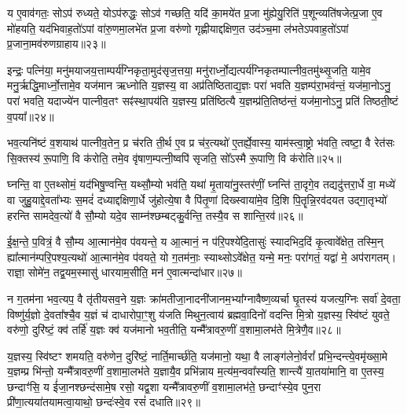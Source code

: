 य ए॒वाव॑गतः॒ सो\-ऽप॑ रुध्यते॒ यो\-ऽप॑रुद्धः॒ सो\-ऽव॑ गच्छति॒ यदि॑ का॒मये॑त प्र॒जा मु॑ह्येयु॒रिति॑ प॒शून्व्यति॑षजेत्प्र॒जा ए॒व मो॑हयति॒ यद॑भिवाह॒तो॑\-ऽपां वा॑रु॒णमा॒लभे॑त प्र॒जा वरु॑णो गृह्णीयाद्दक्षिण॒त उद॑ञ्च॒मा ल॑भते\-ऽपवाह॒तो॑\-ऽ\-पां प्र॒जाना॒मव॑रुणग्राहाय॥२३॥

{\anuvakamend[{रेतो॒ यज॑माने दधाति लो॒क ऐ॒न्द्रꣳ स॒प्तत्रिꣳ॑शच्च॥५॥}]}

इन्द्रः॒ पत्नि॑या॒ मनु॑मयाजय॒त्ताम्पर्य॑ग्निकृता॒मुद॑सृज॒त्तया॒ मनु॑रार्ध्नो॒द्यत्पर्य॑ग्निकृतम्पात्नीव॒तमु॑थ्सृ॒जति॒ यामे॒व मनु॒र्\mbox{}ऋद्धि॒\-मार्ध्नो॒त्तामे॒व यज॑मान ऋध्नोति य॒ज्ञस्य॒ वा अप्र॑तिष्ठिताद्य॒ज्ञः परा॑ भवति य॒ज्ञम्प॑रा॒भव॑न्तं॒ यज॑मा॒नो\-ऽनु॒ परा॑ भवति॒ यदाज्ये॑न पात्नीव॒तꣳ सꣴ॑स्था॒पय॑ति य॒ज्ञस्य॒ प्रति॑ष्ठित्यै य॒ज्ञम्प्र॑ति॒तिष्ठ॑न्तं॒ यज॑मा॒नो\-ऽनु॒ प्रति॑ तिष्ठती॒ष्टं व॒पया᳚॥२४॥

भव॒त्यनि॑ष्टं व॒शयाथ॑ पात्नीव॒तेन॒ प्र च॑रति ती॒र्थ ए॒व प्र च॑र॒त्यथो॑ ए॒तर्\mbox{}ह्ये॒वास्य॒ याम॑स्त्वा॒ष्ट्रो भ॑वति॒ त्वष्टा॒ वै रेत॑सः सि॒क्तस्य॑ रू॒पाणि॒ वि क॑रोति॒ तमे॒व वृ॑षाण॒म्पत्नी॒ष्वपि॑ सृजति॒ सो᳚\-ऽस्मै रू॒पाणि॒ वि क॑रोति॥२५॥

{\anuvakamend[{व॒पया॒ षट्त्रिꣳ॑शच्च॥६॥}]}

घ्नन्ति॒ वा ए॒तथ्सोमं॒ यद॑भिषु॒ण्वन्ति॒ यथ्सौ॒म्यो भव॑ति॒ यथा॑ मृ॒ताया॑नु॒स्तर॑णीं॒ घ्नन्ति॑ ता॒दृगे॒व तद्यदु॑त्तरा॒र्धे वा॒ मध्ये॑ वा जुहु॒याद्दे॒वता᳚भ्यः स॒मदं॑ दध्याद्दक्षिणा॒र्धे जु॑होत्ये॒षा वै पि॑तृ॒णां दिख्स्वाया॑मे॒व दि॒शि पि॒तॄन्नि॒रव॑दयत उद्गा॒तृभ्यो॑ हरन्ति सामदेव॒त्यो॑ वै सौ॒म्यो यदे॒व साम्न॑श्छम्बट्कु॒र्वन्ति॒ तस्यै॒व स शान्ति॒रव॑॥२६॥

ई॒क्ष॒न्ते॒ प॒वित्रं॒ वै सौ॒म्य आ॒त्मान॑मे॒व प॑वयन्ते॒ य आ॒त्मानं॒ न प॑रि॒पश्ये॑दि॒तासुः॑ स्यादभिद॒दिं कृ॒त्वावे᳚क्षेत॒ तस्मि॒न् ह्या᳚त्मान॑म्परि॒पश्य॒त्यथो॑ आ॒त्मान॑मे॒व प॑वयते॒ यो ग॒तम॑नाः॒ स्याथ्सो\-ऽवे᳚क्षेत॒ यन्मे॒ मनः॒ परा॑गतं॒ यद्वा॑ मे॒ अप॑रागतम्। राज्ञा॒ सोमे॑न॒ तद्व॒यम॒स्मासु॑ धारयाम॒सीति॒ मन॑ ए॒वात्मन्दा॑धार॥२७॥

न ग॒तम॑ना भव॒त्यप॒ वै तृ॑तीयसव॒ने य॒ज्ञः क्रा॑मतीजा॒नादनी॑जानम॒भ्या᳚ग्नावैष्ण॒व्यर्चा घृ॒तस्य॑ यजत्य॒ग्निः सर्वा॑ दे॒वता॒ विष्णु॑र्य॒ज्ञो दे॒वता᳚श्चै॒व य॒ज्ञं च॑ दाधारोपा॒ꣳ॒शु य॑जति मिथुन॒त्वाय॑ ब्रह्मवा॒दिनो॑ वदन्ति मि॒त्रो य॒ज्ञस्य॒ स्वि॑ष्टं युवते॒ वरु॑णो॒ दुरि॑ष्टं॒ क्व॑ तर्\mbox{}हि॑ य॒ज्ञः क्व॑ यज॑मानो भव॒तीति॒ यन्मै᳚त्रावरु॒णीं व॒शामा॒लभ॑ते मि॒त्रेणै॒व॥२८॥

य॒ज्ञस्य॒ स्वि॑ष्टꣳ शमयति॒ वरु॑णेन॒ दुरि॑ष्टं॒ नार्ति॒मार्च्छ॑ति॒ यज॑मानो॒ यथा॒ वै लाङ्ग॑लेनो॒र्वरां᳚ प्रभि॒न्दन्त्ये॒वमृ॑ख्सा॒मे य॒ज्ञम्प्र भि॑न्तो॒ यन्मै᳚त्रावरु॒णीं व॒शामा॒लभ॑ते य॒ज्ञायै॒व प्रभि॑न्नाय म॒त्य॑म॒न्ववा᳚स्यति॒ शान्त्यै॑ या॒तया॑मानि॒ वा ए॒तस्य॒ छन्दाꣳ॑सि॒ य ई॑जा॒नश्छन्द॑सामे॒ष रसो॒ यद्व॒शा यन्मै᳚त्रावरु॒णीं व॒शामा॒लभ॑ते॒ छन्दाꣳ॑स्ये॒व पुन॒रा प्री॑णा॒त्यया॑तयामत्वा॒याथो॒ छन्दः॑स्वे॒व रसं॑ दधाति॥२९॥

